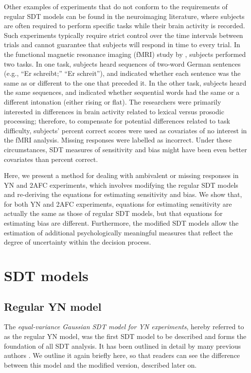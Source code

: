\documentclass[man]{apa6}
\begin{document}
Other examples of experiments that do not conform to the requirements of regular SDT models can be found in the neuroimaging literature, where subjects are often required to perform specific tasks while their brain activity is recorded. Such experiments typically require strict control over the time intervals between trials and cannot guarantee that subjects will respond in time to every trial. In the functional magnetic resonance imaging (fMRI) study by \textcite{kreitewolfhemispheric2014}, subjects performed two tasks. In one task, subjects heard sequences of two-word German sentences (e.g., ``Er schreibt;'' ``Er schreit''), and indicated whether each sentence was the same as or different to the one that preceded it. In the other task, subjects heard the same sequences, and indicated whether sequential words had the same or a different intonation (either rising or flat). The researchers were primarily interested in differences in brain activity related to lexical versus prosodic processing; therefore, to compensate for potential differences related to task difficulty, subjects' percent correct scores were used as covariates of no interest in the fMRI analysis. Missing responses were labelled as incorrect. Under these circumstances, SDT measures of sensitivity and bias might have been even better covariates than percent correct.

Here, we present a method for dealing with ambivalent or missing responses in YN and 2AFC experiments, which involves modifying the regular SDT models and re-deriving the equations for estimating sensitivity and bias. We show that, for both YN and 2AFC experiments, equations for estimating sensitivity are actually the same as those of regular SDT models, but that equations for estimating bias are different. Furthermore, the modified SDT models allow the estimation of additional psychologically meaningful measures that reflect the degree of uncertainty within the decision process.

\section{SDT models}
\subsection{Regular YN model}
The \emph{equal-variance Gaussian SDT model for YN experiments}, hereby referred to as the regular YN model, was the first SDT model to be described \parencite{Peterson1954, Tanner1954} and forms the foundation of all SDT analysis. It has been outlined in detail by many previous authors \parencite[e.g.,][]{Green1966, Macmillan2005}. We outline it again briefly here, so that readers can see the difference between this model and the modified version, described later on.
\end{document}
